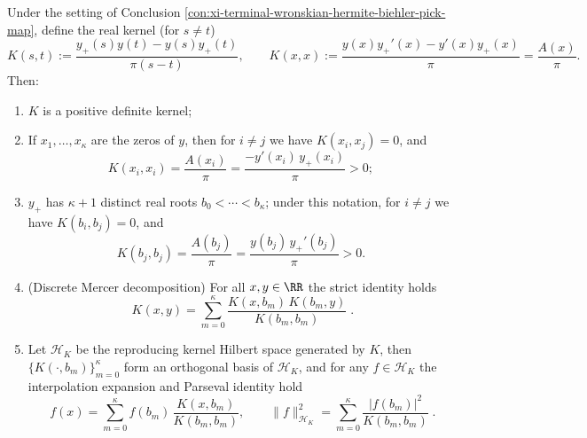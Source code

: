 \begin{conclusion}\label{con:xi-terminal-wronskian-kernel-discrete-mercer-parseval}
Under the setting of Conclusion \ref{con:xi-terminal-wronskian-hermite-biehler-pick-map}, define the real kernel (for \(s\neq t\))
\[
K(s,t):=\frac{y_{+}(s)y(t)-y(s)y_{+}(t)}{\pi(s-t)},\qquad
K(x,x):=\frac{y(x)y_{+}'(x)-y'(x)y_{+}(x)}{\pi}=\frac{A(x)}{\pi}.
\]
Then:
\begin{enumerate}
  \item \(K\) is a positive definite kernel;
  \item If \(x_1,\dots,x_{\kappa}\) are the zeros of \(y\), then for \(i\neq j\) we have \(K(x_i,x_j)=0\), and
  \[
  K(x_i,x_i)=\frac{A(x_i)}{\pi}=\frac{-y'(x_i)\,y_{+}(x_i)}{\pi}>0;
  \]
  \item \(y_{+}\) has \(\kappa+1\) distinct real roots \(b_0<\cdots<b_{\kappa}\);
  under this notation, for \(i\neq j\) we have \(K(b_i,b_j)=0\), and
  \[
  K(b_j,b_j)=\frac{A(b_j)}{\pi}=\frac{y(b_j)\,y_{+}'(b_j)}{\pi}>0.
  \]
  \item (Discrete Mercer decomposition) For all \(x,y\in\RR\) the strict identity holds
  \[
  \boxed{\;
  K(x,y)=\sum_{m=0}^{\kappa}\frac{K(x,b_m)\,K(b_m,y)}{K(b_m,b_m)}\; }.
  \]
  \item Let \(\mathcal{H}_K\) be the reproducing kernel Hilbert space generated by \(K\), then
  \(\{K(\cdot,b_m)\}_{m=0}^{\kappa}\) form an orthogonal basis of \(\mathcal{H}_K\), and for any \(f\in\mathcal{H}_K\) the interpolation expansion and Parseval identity hold
  \[
  \boxed{\;
  f(x)=\sum_{m=0}^{\kappa} f(b_m)\,\frac{K(x,b_m)}{K(b_m,b_m)},
  \qquad
  \|f\|_{\mathcal{H}_K}^{2}=\sum_{m=0}^{\kappa}\frac{|f(b_m)|^{2}}{K(b_m,b_m)}\; }.
  \]
\end{enumerate}
\end{conclusion}
